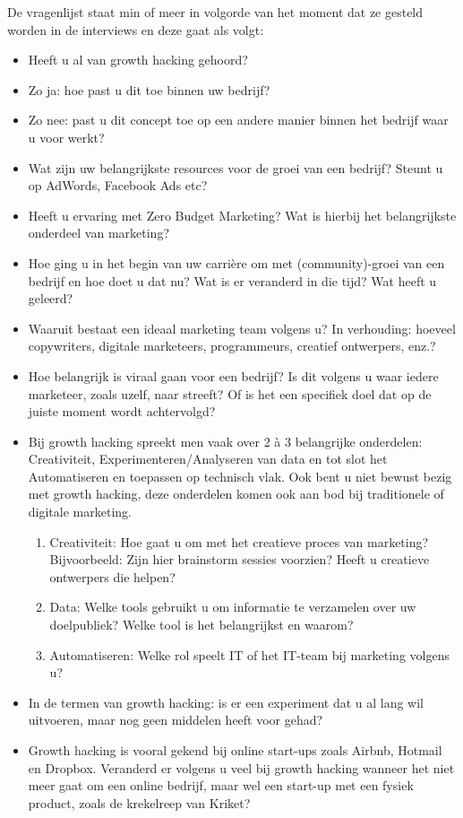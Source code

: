 De vragenlijst staat min of meer in volgorde van het moment dat ze gesteld worden in de interviews en deze gaat als volgt:
\begin{itemize} 
	\item Heeft u al van growth hacking gehoord?
	\item Zo ja: hoe past u dit toe binnen uw bedrijf?
	\item Zo nee: past u dit concept toe op een andere manier binnen het bedrijf waar u voor werkt?
	\item Wat zijn uw belangrijkste resources voor de groei van een bedrijf? Steunt u op AdWords, Facebook Ads etc?
	\item Heeft u ervaring met Zero Budget Marketing? Wat is hierbij het belangrijkste onderdeel van marketing?
	\item Hoe ging u in het begin van uw carrière om met (community)-groei van een bedrijf en hoe doet u dat nu? Wat is er veranderd in die tijd? Wat heeft u geleerd?
	\item Waaruit bestaat een ideaal marketing team volgens u? In verhouding: hoeveel copywriters, digitale marketeers, programmeurs, creatief ontwerpers, enz.?
	\item Hoe belangrijk is viraal gaan voor een bedrijf? Is dit volgens u waar iedere marketeer, zoals uzelf, naar streeft? Of is het een specifiek doel dat op de juiste moment wordt achtervolgd?
	\item Bij growth hacking spreekt men vaak over 2 à 3 belangrijke onderdelen: Creativiteit, Experimenteren/Analyseren van data en tot slot het Automatiseren en toepassen op technisch vlak. Ook bent u niet bewust bezig met growth hacking, deze onderdelen komen ook aan bod bij traditionele of digitale marketing.
	\begin{enumerate}[label*=\arabic*.]
		\item Creativiteit: Hoe gaat u om met het creatieve proces van marketing? Bijvoorbeeld: Zijn hier brainstorm sessies voorzien? Heeft u creatieve ontwerpers die helpen?
		\item Data: Welke tools gebruikt u om informatie te verzamelen over uw doelpubliek? Welke tool is het belangrijkst en waarom?
		\item Automatiseren: Welke rol speelt IT of het IT-team bij marketing volgens u? 
	\end{enumerate}
	\item In de termen van growth hacking: is er een experiment dat u al lang wil uitvoeren, maar nog geen middelen heeft voor gehad?
	\item Growth hacking is vooral gekend bij online start-ups zoals Airbnb, Hotmail en Dropbox. Veranderd er volgens u veel bij growth hacking wanneer het niet meer gaat om een online bedrijf, maar wel een start-up met een fysiek product, zoals de krekelreep van Kriket?
\end{itemize}

